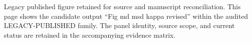 Legacy published figure retained for source and manuscript reconciliation. This page shows the candidate output ``Fig md msd kappa revised'' within the audited LEGACY-PUBLISHED family. The panel identity, source scope, and current status are retained in the accompanying evidence matrix.
